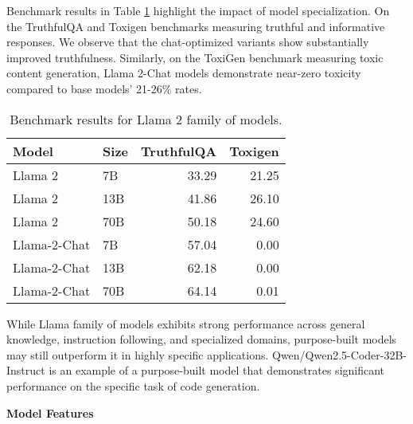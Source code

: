 Benchmark results  in Table \ref{tab:llama2_benchmark} highlight the impact of model specialization. On the TruthfulQA  and Toxigen  benchmarks measuring truthful and informative responses. We observe that the chat-optimized variants show substantially improved truthfulness. Similarly, on the ToxiGen benchmark measuring toxic content generation, Llama 2-Chat models demonstrate near-zero toxicity compared to base models' 21-26\% rates.
\begin{table}[H]
\centering
\caption{Benchmark results for Llama 2 family of models.}
\label{tab:llama2_benchmark}
\begin{tabular}{llrr}
\hline
Model & Size & TruthfulQA & Toxigen \\
\hline
Llama 2 & 7B & 33.29 & 21.25 \\
Llama 2 & 13B & 41.86 & 26.10 \\
Llama 2 & 70B & 50.18 & 24.60 \\
Llama-2-Chat & 7B & 57.04 & 0.00 \\
Llama-2-Chat & 13B & 62.18 & 0.00 \\
Llama-2-Chat & 70B & 64.14 & 0.01 \\
\hline
\end{tabular}
\end{table}

While Llama family of models exhibits strong performance across general knowledge, instruction following, and specialized domains, purpose-built models may still outperform it in highly specific applications. Qwen/Qwen2.5-Coder-32B-Instruct  is an example of a purpose-built model that demonstrates significant performance on the specific task of code generation.

\textbf{Model Features}

